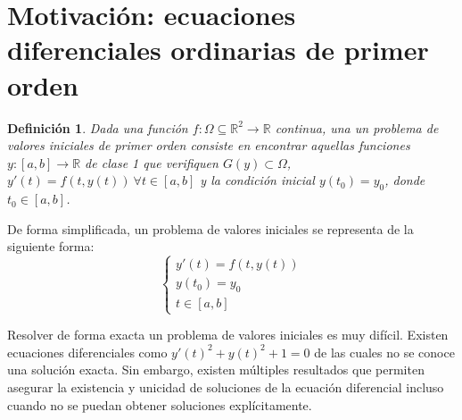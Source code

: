\documentclass{article}
\theoremstyle{theorem-style}  %
\theoremstyle{definition-style}
\newtheorem{definition}{Definición}[section]
\theoremstyle{example-style}
\begin{document}
\maketitle



\newpage
\tableofcontents
\newpage


\section{Motivación: ecuaciones diferenciales ordinarias de primer orden} \label{sec:motivacion}

	\begin{definition} 
		Dada una función $f:\Omega \subseteq \mathbb R^2  \to \mathbb{R}$ continua, una un problema de valores iniciales de primer orden consiste en encontrar aquellas funciones $y: [a,b] \rightarrow \mathbb{R}$ de clase 1 que verifiquen $G(y) \subset \Omega$, $y'(t) = f(t,y(t)) \ \forall t \in [a,b]$ y la condición inicial $y(t_0) = y_0$, donde $t_0 \in [a,b]$.  
	\end{definition}

	De forma simplificada, un problema de valores iniciales se representa de la siguiente forma: 
	\begin{equation*}
		\begin{cases}
			y'(t) = f(t,y(t)) \\
			y(t_0) = y_0 \\
			t \in [a,b]
		\end{cases}
	\end{equation*}

	Resolver de forma exacta un problema de valores iniciales es muy difícil. Existen ecuaciones diferenciales como $y'(t)^2 + y(t)^2 + 1 = 0$ de las cuales no se conoce una solución exacta. Sin embargo, existen múltiples resultados que permiten asegurar la existencia y unicidad de soluciones de la ecuación diferencial incluso cuando no se puedan obtener soluciones explícitamente.
\end{document}
